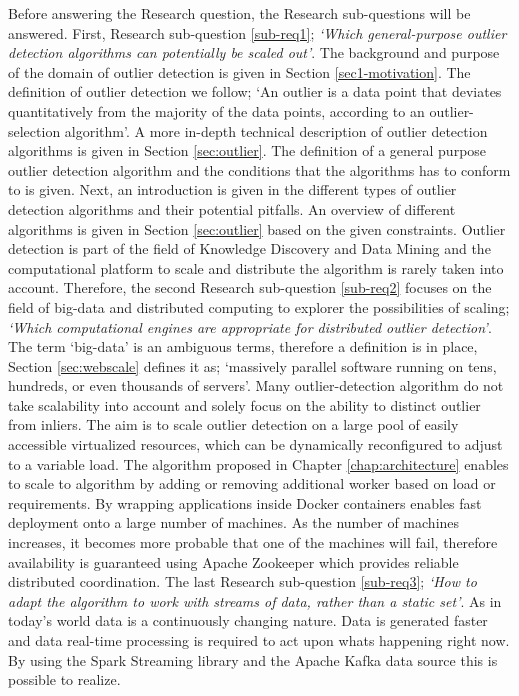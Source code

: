 Before answering the Research question, the Research sub-questions will be answered. First, Research sub-question \ref{sub-req1}; \emph{`Which general-purpose outlier detection algorithms can potentially be scaled out'}. The background and purpose of the domain of outlier detection is given in Section \ref{sec1-motivation}. The definition of outlier detection we follow; `An outlier is a data point that deviates quantitatively from the majority of the data points, according to an outlier-selection algorithm'. A more in-depth technical description of outlier detection algorithms is given in Section \ref{sec:outlier}. The definition of a general purpose outlier detection algorithm and the conditions that the algorithms has to conform to is given. Next, an introduction is given in the different types of outlier detection algorithms and their potential pitfalls. An overview of different algorithms is given in Section \ref{sec:outlier} based on the given constraints. 
Outlier detection is part of the field of Knowledge Discovery and Data Mining and the computational platform to scale and distribute the algorithm is rarely taken into account. Therefore, the second Research sub-question \ref{sub-req2} focuses on the field of big-data and distributed computing to explorer the possibilities of scaling; \emph{`Which computational engines are appropriate for distributed outlier detection'}. The term `big-data' is an ambiguous terms, therefore a definition is in place, Section \ref{sec:webscale} defines it as; `massively parallel software running on tens, hundreds, or even thousands of servers'. Many  outlier-detection algorithm do not take scalability into account and solely focus on the ability to distinct outlier from inliers. The aim is to scale outlier detection on a large pool of easily accessible virtualized resources, which can be dynamically reconfigured to adjust to a variable load. The algorithm proposed in Chapter \ref{chap:architecture} enables to scale to algorithm by adding or removing additional worker based on load or requirements. By wrapping applications inside Docker containers enables fast deployment onto a large number of machines. As the number of machines increases, it becomes more probable that one of the machines will fail, therefore availability is guaranteed using Apache Zookeeper which provides reliable distributed coordination.
The last Research sub-question \ref{sub-req3}; \emph{`How to adapt the algorithm to work with streams of data, rather than a static set'}. As in today's world data is a continuously changing nature. Data is generated faster and data real-time processing is required to act upon whats happening right now. By using the Spark Streaming library and the Apache Kafka data source this is possible to realize.

